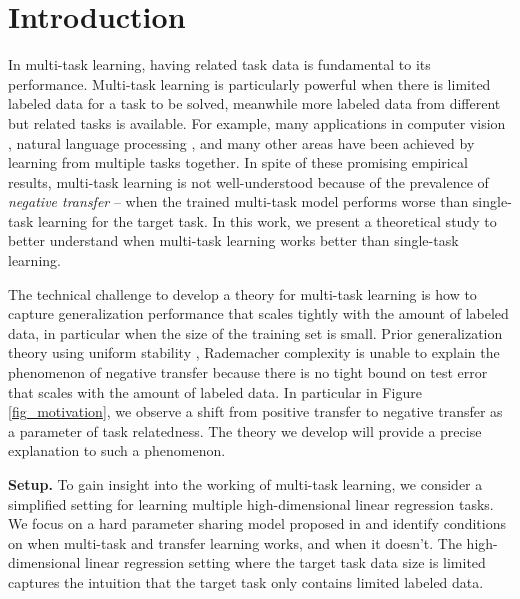 \section{Introduction}

In multi-task learning, having related task data is fundamental to its performance.
Multi-task learning is particularly powerful when there is limited labeled data for a task to be solved, meanwhile more labeled data from different but related tasks is available.
For example, many applications in computer vision \cite{ZSSGM18}, natural language processing \cite{MTDNN19}, and many other areas have been achieved by learning from multiple tasks together.
In spite of these promising empirical results, multi-task learning is not well-understood because of the prevalence of \textit{negative transfer} -- when the trained multi-task model performs worse than single-task learning for the target task.
In this work, we present a theoretical study to better understand when multi-task learning works better than single-task learning. %

The technical challenge to develop a theory for multi-task learning is how to capture generalization performance that scales tightly with the amount of labeled data, in particular when the size of the training set is small.
Prior generalization theory using uniform stability \cite{LTSM16}, Rademacher complexity \cite{BS03,BBCKP10} is unable to explain the phenomenon of negative transfer because there is no tight bound on test error that scales with the amount of labeled data.
In particular in Figure \ref{fig_motivation}, we observe a shift from positive transfer to negative transfer as a parameter of task relatedness.
The theory we develop will provide a precise explanation to such a phenomenon.

\textbf{Setup.} To gain insight into the working of multi-task learning, we consider a simplified setting for learning multiple high-dimensional linear regression tasks.
We focus on a hard parameter sharing model proposed in \cite{R17,WZR20} and identify conditions on when multi-task and transfer learning works, and when it doesn't.
The high-dimensional linear regression setting where the target task data size is limited captures the intuition that the target task only contains limited labeled data.

